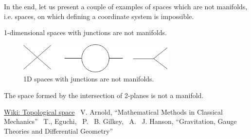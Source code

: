 \documentclass[a4paper,10pt]{article}
\begin{document}
In the end, let us present a couple of examples of spaces which are not manifolds, i.e. spaces, on which defining a coordinate system is impossible.

1-dimensional spaces with junctions are not manifolds.

\begin{figure}[h]
\centering
 \includegraphics[width=0.7\textwidth]{../../images/NonManifolds.png}
 \caption{ 1D spaces with junctions are not manifolds.}
 \label{fig:nm}
\end{figure}

The space formed by the intersection of 2-planes is not a manifold.

\begin{thebibliography}{1}
 \href{https://en.wikipedia.org/wiki/Topological_space}{Wiki: Topological space}
 ~V. Arnold, ``Mathematical Methods in Classical Mechanics''
 ~T., Eguchi, ~P. ~B. Gilkey, ~A. ~J. Hanson,  ``Gravitation, Gauge Theories and Differential Geometry''
\end{thebibliography}
\end{document}
